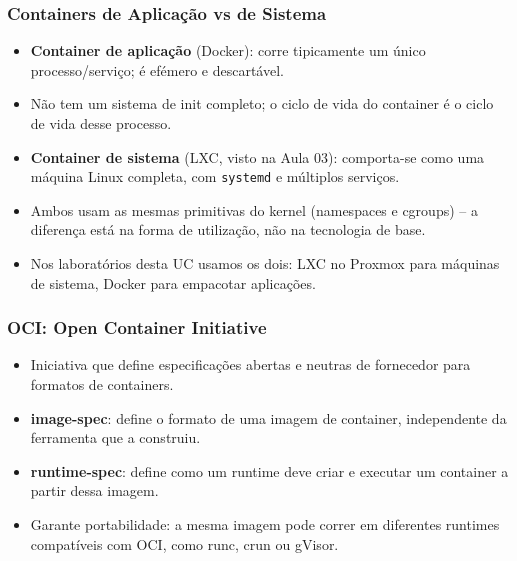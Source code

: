 \documentclass[aspectratio=169]{beamer}
\begin{document}
\begin{frame}
\frametitle{Containers de Aplicação vs de Sistema}
\begin{itemize}
    \setlength\itemsep{0.4cm}
    \item \textbf{Container de aplicação} (Docker): corre tipicamente um único processo/serviço; é efémero e descartável.
    \item Não tem um sistema de init completo; o ciclo de vida do container é o ciclo de vida desse processo.
    \item \textbf{Container de sistema} (LXC, visto na Aula 03): comporta-se como uma máquina Linux completa, com \texttt{systemd} e múltiplos serviços.
    \item Ambos usam as mesmas primitivas do kernel (namespaces e cgroups) -- a diferença está na forma de utilização, não na tecnologia de base.
    \item Nos laboratórios desta UC usamos os dois: LXC no Proxmox para máquinas de sistema, Docker para empacotar aplicações.
\end{itemize}
\end{frame}

\begin{frame}
\frametitle{OCI: Open Container Initiative}
\begin{itemize}
    \setlength\itemsep{0.4cm}
    \item Iniciativa que define especificações abertas e neutras de fornecedor para formatos de containers.
    \item \textbf{image-spec}: define o formato de uma imagem de container, independente da ferramenta que a construiu.
    \item \textbf{runtime-spec}: define como um runtime deve criar e executar um container a partir dessa imagem.
    \item Garante portabilidade: a mesma imagem pode correr em diferentes runtimes compatíveis com OCI, como runc, crun ou gVisor.
\end{itemize}
\end{frame}
\end{document}
